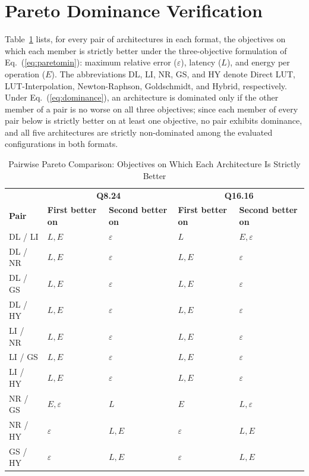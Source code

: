 \documentclass[manuscript,screen,review]{acmart}
\begin{document}
\section{Pareto Dominance Verification}
\label{app:dominance}
 
Table~\ref{tab:app_dominance} lists, for every pair of architectures in each format, the objectives on which each member is strictly better under the three-objective formulation of Eq.~(\ref{eq:paretomin}): maximum relative error ($\varepsilon$), latency ($L$), and energy per operation ($E$). The abbreviations DL, LI, NR, GS, and HY denote Direct LUT, LUT-Interpolation, Newton-Raphson, Goldschmidt, and Hybrid, respectively. Under Eq.~(\ref{eq:dominance}), an architecture is dominated only if the other member of a pair is no worse on all three objectives; since each member of every pair below is strictly better on at least one objective, no pair exhibits dominance, and all five architectures are strictly non-dominated among the evaluated configurations in both formats.
 
\begin{table}[htbp]
\caption{Pairwise Pareto Comparison: Objectives on Which Each Architecture Is Strictly Better}
\label{tab:app_dominance}
\begin{tabular}{@{}lllll@{}}
\toprule
& \multicolumn{2}{c}{\textbf{Q8.24}} & \multicolumn{2}{c}{\textbf{Q16.16}} \\
\textbf{Pair} & \textbf{First better on} & \textbf{Second better on} & \textbf{First better on} & \textbf{Second better on} \\
\midrule
DL / LI & $L, E$ & $\varepsilon$ & $L$ & $E, \varepsilon$ \\
DL / NR & $L, E$ & $\varepsilon$ & $L, E$ & $\varepsilon$ \\
DL / GS & $L, E$ & $\varepsilon$ & $L, E$ & $\varepsilon$ \\
DL / HY & $L, E$ & $\varepsilon$ & $L, E$ & $\varepsilon$ \\
LI / NR & $L, E$ & $\varepsilon$ & $L, E$ & $\varepsilon$ \\
LI / GS & $L, E$ & $\varepsilon$ & $L, E$ & $\varepsilon$ \\
LI / HY & $L, E$ & $\varepsilon$ & $L, E$ & $\varepsilon$ \\
NR / GS & $E, \varepsilon$ & $L$ & $E$ & $L, \varepsilon$ \\
NR / HY & $\varepsilon$ & $L, E$ & $\varepsilon$ & $L, E$ \\
GS / HY & $\varepsilon$ & $L, E$ & $\varepsilon$ & $L, E$ \\
\bottomrule
\end{tabular}
\end{table}
 
\end{document}
